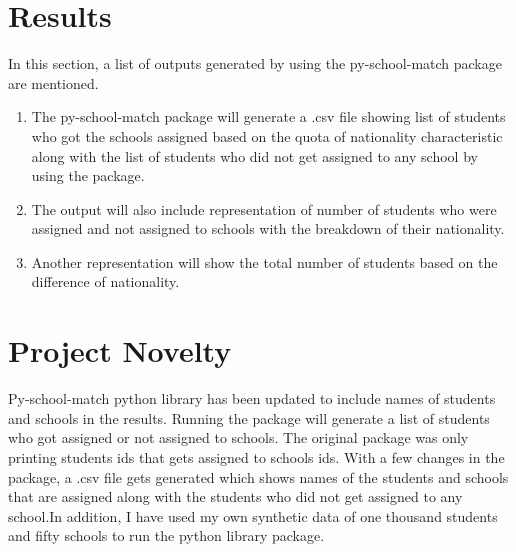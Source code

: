 \documentclass[twocolumn]{bmcart}
\begin{document}
	
	\section*{Results}
	\vspace{\baselineskip}
	In this section, a list of outputs generated by using the py-school-match package are mentioned.\vspace{\baselineskip}
	
	\begin{enumerate}
		\vspace{-0.4cm}\item The py-school-match package will generate a .csv file showing list of students who got the schools assigned based on the quota of nationality characteristic along with the list of students who did not get assigned to any school by using the package. \vspace{\baselineskip}
		\vspace{-0.4cm}\item The output will also include representation of number of students who were assigned and not assigned to schools with the breakdown of their nationality. \vspace{\baselineskip}
		\vspace{-0.4cm}\item Another representation will show the total number of students based on the difference of nationality.
		\vspace{\baselineskip} 
	\end{enumerate}
	
	\section*{Project Novelty}
	
	Py-school-match python library has been updated to include names of students and schools in the results. Running the package will generate a list of students who got assigned or not assigned to schools. The original package was only printing students ids that gets assigned to schools ids. With a few changes in the package, a .csv file gets generated which shows names of the students and schools that are assigned along with the students who did not get assigned to any school.In addition, I have used my own synthetic data of one thousand students and fifty schools to run the python library package.
	
\end{document}

